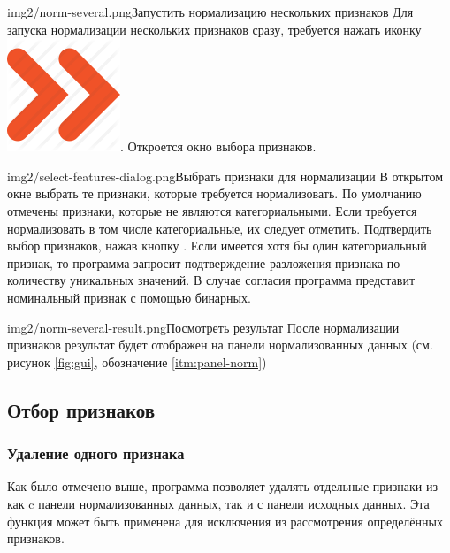 \documentclass[12pt,tikz]{instruction}
\begin{document}
\begin{steps}
	\begin{ist}{img2/norm-several.png}{Запустить нормализацию нескольких признаков }
		Для запуска нормализации нескольких признаков сразу, требуется нажать иконку \includegraphics[scale=0.1]{img2/norm_all.png}. Откроется окно выбора признаков.
	\end{ist}
	\begin{ist}{img2/select-features-dialog.png}{Выбрать признаки для нормализации}
		В открытом окне выбрать те признаки, которые требуется нормализовать. По умолчанию отмечены признаки, которые не являются категориальными. Если требуется нормализовать в том числе категориальные, их следует отметить. Подтвердить выбор признаков, нажав кнопку . Если имеется хотя бы один категориальный признак, то программа запросит подтверждение разложения признака по количеству уникальных значений. В случае согласия программа представит номинальный признак с помощью бинарных.
	\end{ist}		
	\begin{ist}{img2/norm-several-result.png}{Посмотреть результат}
		После нормализации признаков результат будет отображен на панели нормализованных данных (см. рисунок \ref{fig:gui}, обозначение \ref{itm:panel-norm})
	\end{ist}
		
\end{steps}



\newpage
\subsection{Отбор признаков}
\subsubsection{Удаление одного признака}
\label{subsubsec:deleteone}

Как было отмечено выше, программа позволяет удалять отдельные признаки из как c панели нормализованных данных, так и с панели исходных данных. Эта функция может быть применена для исключения из рассмотрения определённых признаков.
\end{document}
